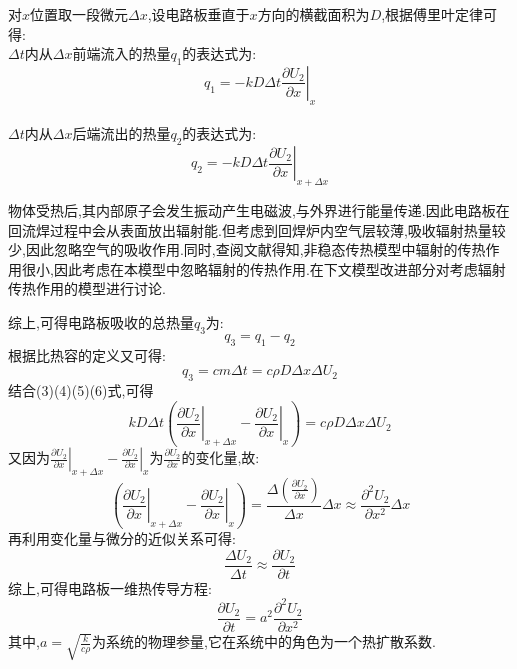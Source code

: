 \documentclass[12pt]{ctexart}
\numberwithin{figure}{section}
\numberwithin{table}{section}
\begin{document}
对$x$位置取一段微元$\Delta x$,设电路板垂直于$x$方向的横截面积为$D$,根据傅里叶定律可得\cite{2}:\\
$\Delta t$内从$\Delta x$前端流入的热量$q_1$的表达式为:
\begin{equation}
q_1=-kD\Delta t\left.\frac{\partial U_2}{\partial x}\right|_{x}
\end{equation}\\
$\Delta t$内从$\Delta x$后端流出的热量$q_2$的表达式为:
\begin{equation}
q_2=-kD\Delta t\left.\frac{\partial U_2}{\partial x}\right|_{x+\Delta x}
\end{equation}

物体受热后,其内部原子会发生振动产生电磁波,与外界进行能量传递.因此电路板在回流焊过程中会从表面放出辐射能.但考虑到回焊炉内空气层较薄,吸收辐射热量较少,因此忽略空气的吸收作用.同时,查阅文献得知\cite{4},非稳态传热模型中辐射的传热作用很小,因此考虑在本模型中忽略辐射的传热作用.在下文模型改进部分对考虑辐射传热作用的模型进行讨论.

综上,可得电路板吸收的总热量$q_3$为:
\begin{equation}
q_3=q_1-q_2
\end{equation}
根据比热容的定义又可得:
\begin{equation}
q_3=cm\Delta t=c\rho D\Delta x\Delta U_2
\end{equation}
结合(3)(4)(5)(6)式,可得
\begin{equation}
kD\Delta t(\left.\frac{\partial U_2}{\partial x}\right|_{x+\Delta x}-\left.\frac{\partial U_2}{\partial x}\right|_{x})=c\rho D\Delta x\Delta U_2
\end{equation}
又因为$\left.\frac{\partial U_2}{\partial x}\right|_{x+\Delta x}-\left.\frac{\partial U_2}{\partial x}\right|_{x}
$为$\frac{\partial U_2}{\partial x}$的变化量,故:
\begin{equation}
(\left.\frac{\partial U_2}{\partial x}\right|_{x+\Delta x}-\left.\frac{\partial U_2}{\partial x}\right|_{x})=\frac{\Delta(\frac{\partial U_2}{\partial x})}{\Delta x}\Delta x\approx\frac{\partial^2 U_2}{\partial x^2}\Delta x
\end{equation}
再利用变化量与微分的近似关系可得:
\begin{equation}
\frac{\Delta U_2}{\Delta t}\approx \frac{\partial U_2}{\partial t}
\end{equation}
综上,可得电路板一维热传导方程:
\begin{equation}
\frac{\partial U_2}{\partial t}=a^2\frac{\partial^2 U_2}{\partial x^2}
\end{equation}
其中,$a=\sqrt{\frac{k}{c\rho}}$为系统的物理参量,它在系统中的角色为一个热扩散系数.
\end{document}
